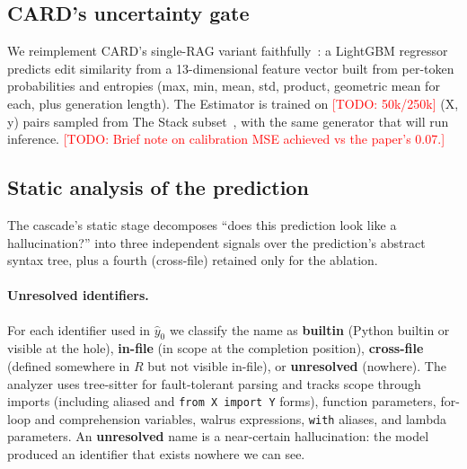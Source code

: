 \documentclass[10pt,twocolumn]{article}
\newcommand{\todo}[1]{\textcolor{red}{[TODO: #1]}}
\begin{document}
\subsection{CARD's uncertainty gate}

We reimplement CARD's single-RAG variant
faithfully~\cite{zhang2024card}: a LightGBM regressor predicts edit
similarity from a 13-dimensional feature vector built from per-token
probabilities and entropies (max, min, mean, std, product, geometric
mean for each, plus generation length). The Estimator is trained on
\todo{50k/250k} (X, y) pairs sampled from The Stack
subset~\cite{kocetkov2022stack}, with the same generator that will run
inference. \todo{Brief note on calibration MSE achieved vs the paper's 0.07.}

\subsection{Static analysis of the prediction}

The cascade's static stage decomposes ``does this prediction look like a
hallucination?'' into three independent signals over the prediction's
abstract syntax tree, plus a fourth (cross-file) retained only for the
ablation.

\paragraph{Unresolved identifiers.} For each identifier used in
$\hat{y}_0$ we classify the name as \textbf{builtin} (Python builtin or
visible at the hole), \textbf{in-file} (in scope at the completion
position), \textbf{cross-file} (defined somewhere in $R$ but not visible
in-file), or \textbf{unresolved} (nowhere). The analyzer uses tree-sitter
for fault-tolerant parsing and tracks scope through imports (including
aliased and \texttt{from X import Y} forms), function parameters,
for-loop and comprehension variables, walrus expressions, \texttt{with}
aliases, and lambda parameters. An \textbf{unresolved} name is a
near-certain hallucination: the model produced an identifier that exists
nowhere we can see.
\end{document}
